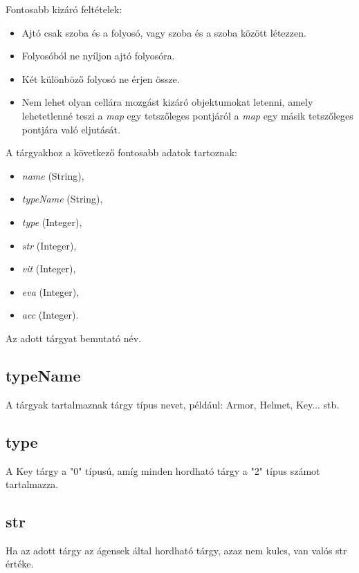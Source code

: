\noindent Fontosabb kizáró feltételek:
\begin{itemize}
    \item Ajtó csak szoba és a folyosó, vagy szoba és a szoba között létezzen.
    \item Folyosóból ne nyíljon ajtó folyosóra.
    \item Két különböző folyosó ne érjen össze.
    \item Nem lehet olyan cellára mozgást kizáró objektumokat letenni, amely lehetetlenné teszi a \textit{map} egy tetszőleges pontjáról a \textit{map} egy másik tetszőleges pontjára való eljutását.
\end{itemize}


A tárgyakhoz a következő fontosabb adatok tartoznak:
\begin{itemize}
    \item \textit{name} (String),
    \item \textit{typeName} (String),
    \item \textit{type} (Integer),
    \item \textit{str} (Integer),
    \item \textit{vit} (Integer),
    \item \textit{eva} (Integer),
    \item \textit{acc} (Integer).
\end{itemize}


Az adott tárgyat bemutató név.

\subsection{typeName}

A tárgyak tartalmaznak tárgy típus nevet, például: Armor, Helmet, Key... stb.

\subsection{type}

A Key tárgy a "0" típusú, amíg minden hordható tárgy a "2" típus számot tartalmazza.

\subsection{str}

Ha az adott tárgy az ágensek által hordható tárgy, azaz nem kulcs, van valós str értéke.

